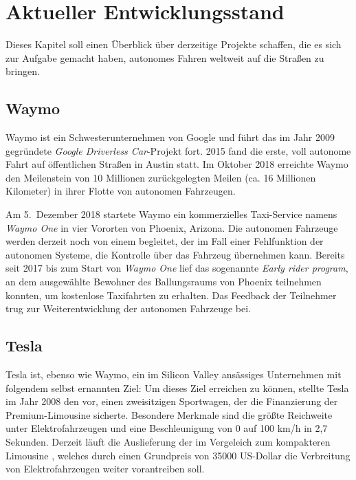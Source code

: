 \chapter{Aktueller Entwicklungsstand}

Dieses Kapitel soll einen Überblick über derzeitige Projekte schaffen, die es sich zur Aufgabe gemacht haben, autonomes Fahren weltweit auf die Straßen zu bringen.

\section{Waymo}

Waymo ist ein Schwesterunternehmen von Google und führt das im Jahr 2009 gegründete \textit{Google Driverless Car}-Projekt fort. 2015 fand die erste, voll autonome Fahrt auf öffentlichen Straßen in Austin statt. Im Oktober 2018 erreichte Waymo den Meilenstein von 10 Millionen zurückgelegten Meilen (ca. 16 Millionen Kilometer) in ihrer Flotte von autonomen Fahrzeugen.

Am 5.\ Dezember 2018 startete Waymo ein kommerzielles Taxi-Service namens \textit{Waymo One} in vier Vororten von Phoenix, Arizona. Die autonomen Fahrzeuge werden derzeit noch von einem  begleitet, der im Fall einer Fehlfunktion der autonomen Systeme, die Kontrolle über das Fahrzeug übernehmen kann.
 Bereits seit 2017 bis zum Start von \textit{Waymo One} lief das sogenannte \textit{Early rider program}, an dem ausgewählte Bewohner des Ballungsraums von Phoenix teilnehmen konnten, um kostenlose Taxifahrten zu erhalten. Das Feedback der Teilnehmer trug zur Weiterentwicklung der autonomen Fahrzeuge bei.


\section{Tesla}

Tesla ist, ebenso wie Waymo, ein im Silicon Valley ansässiges Unternehmen mit folgendem selbst ernannten Ziel:  Um dieses Ziel erreichen zu können, stellte Tesla im Jahr 2008 den  vor, einen zweisitzigen Sportwagen, der die Finanzierung der Premium-Limousine  sicherte. Besondere Merkmale sind die größte Reichweite unter Elektrofahrzeugen und eine Beschleunigung von 0 auf 100 \si[per-mode=symbol]{\kilo\metre\per\hour} in 2,7 Sekunden. Derzeit läuft die Auslieferung der im Vergeleich zum  kompakteren Limousine , welches durch einen Grundpreis von \num{35000} US-Dollar die Verbreitung von Elektrofahrzeugen weiter vorantreiben soll.


